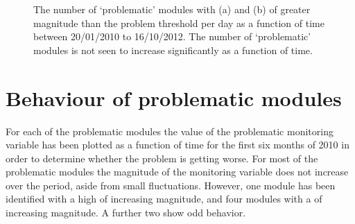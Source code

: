 \begin{figure}
	\centering
	\caption{The number of `problematic' modules with (a) \deltat and (b)
        \tdiff of greater magnitude than the problem threshold per day as a
        function of time between 20/01/2010 to 16/10/2012. The number of
        `problematic' modules is not seen to increase significantly as a
        function of time.}
	\label{fig:num_pm}
\end{figure}

\section{Behaviour of problematic modules}

For each of the problematic modules the value of the problematic monitoring variable has been plotted as a function of time for the first six months of 2010 in order to determine whether the problem is getting worse. For most of the problematic modules the magnitude of the monitoring variable does not increase over the period, aside from small fluctuations.  However, one module has been identified with a high \deltat of increasing magnitude, and four modules with a \tdiff of increasing magnitude. A further two show odd behavior. 

